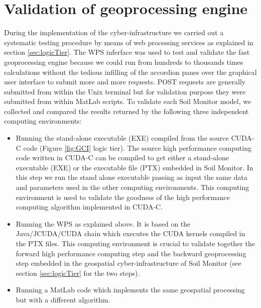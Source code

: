 \documentclass[APA,LATO1COL,doublespace]{WileyNJD-v2}
\newcommand{\update}[1]{\emph{\textcolor{blue}{#1}}}     %
\begin{document}
\section{Validation of geoprocessing engine}\label{sec:validation} %
During the implementation of the 
cyber-infrastructure we carried out a systematic testing procedure by means of web processing services as explained in section \ref{sec:logicTier}.
The WPS inferface was used to test and validate the fast geoprocessing engine because we could run from hundreds to thousands times calculations without the tedious infilling of the accordion panes over the graphical user interface to submit more and more requests.
POST requests are generally submitted from within the Unix terminal but for validation purpose they were submitted from within MatLab scripts. %
To validate each Soil Monitor model, we collected and compared the results returned by the following three independent computing environments:
\begin{itemize}
    \item Running the stand-alone executable (EXE) compiled from the source CUDA-C code (Figure \ref{fig:GCI} logic tier).
    The source high performance computing code written in CUDA-C can be compiled to get either a stand-alone executable (EXE) or the executable file (PTX) embedded in Soil Monitor.
    In this step we run the stand alone executable passing as input the same data and parameters used in the other computing environments.
    This computing environment is used to validate the goodness of the high performance computing algorithm implemented in CUDA-C.
    \item Running the WPS as explained above.
    It is based on the Java/JCUDA/CUDA chain which executes the CUDA kernels compiled in the PTX files. This computing environment is crucial to validate together the forward high performance computing step and the backward geoprocessing step embedded in the geospatial cyber-infrastructure of Soil Monitor (see section \ref{sec:logicTier} for the two steps). 
    \item Running a MatLab code which implements the same geospatial processing but with a different algorithm.
\end{itemize}
\end{document}
